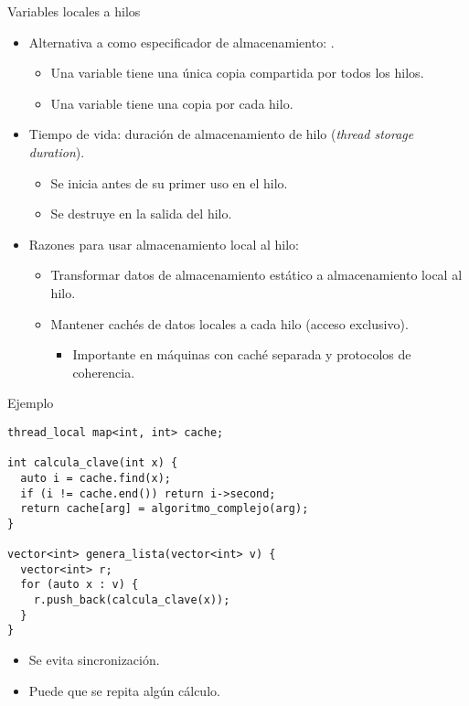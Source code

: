 \begin{frame}{Variables locales a hilos}
\begin{itemize}
  \item Alternativa a  como especificador de almacenamiento: .
    \begin{itemize}
      \item Una variable  tiene una única copia compartida por todos los hilos.
      \item Una variable  tiene una copia por cada hilo.
    \end{itemize}
  \item Tiempo de vida: duración de almacenamiento de hilo (\emph{thread storage duration}).
    \begin{itemize}
      \item Se inicia antes de su primer uso en el hilo.
      \item Se destruye en la salida del hilo.
    \end{itemize}
  \item Razones para usar almacenamiento local al hilo:
    \begin{itemize}
      \item Transformar datos de almacenamiento estático a almacenamiento local al hilo.
      \item Mantener cachés de datos locales a cada hilo (acceso exclusivo).
        \begin{itemize}
          \item Importante en máquinas con caché separada y protocolos de coherencia.
        \end{itemize}
    \end{itemize}
\end{itemize}
\end{frame}

\begin{frame}[fragile]{Ejemplo}
\begin{lstlisting}
thread_local map<int, int> cache;

int calcula_clave(int x) {
  auto i = cache.find(x);
  if (i != cache.end()) return i->second;
  return cache[arg] = algoritmo_complejo(arg);
}

vector<int> genera_lista(vector<int> v) {
  vector<int> r;
  for (auto x : v) {
    r.push_back(calcula_clave(x));
  }
}
\end{lstlisting}
\begin{itemize}
  \item Se evita sincronización.
  \item Puede que se repita algún cálculo.
\end{itemize}
\end{frame}
